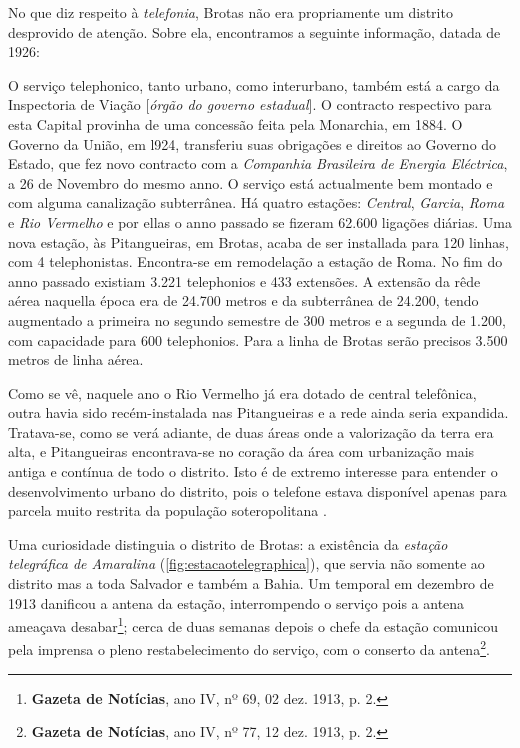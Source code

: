 No que diz respeito à \textit{telefonia}, Brotas não era propriamente um distrito desprovido de atenção. Sobre ela, encontramos a seguinte informação, datada de 1926:

\begin{citacao}
O serviço telephonico, tanto urbano, como interurbano, também está a cargo da Inspectoria de Viação [\textit{órgão do governo estadual}].
O contracto respectivo para esta Capital provinha de uma concessão feita pela Monarchia, em 1884.
O Governo da União, em l924, transferiu suas obrigações e direitos ao Governo do Estado, que fez novo contracto com a \textit{Companhia Brasileira de Energia Eléctrica}, a 26 de Novembro do mesmo anno.
O serviço está actualmente bem montado e com alguma canalização subterrânea.
Há quatro estações: \textit{Central}, \textit{Garcia}, \textit{Roma} e \textit{Rio Vermelho} e por ellas o anno passado se fizeram 62.600 ligações diárias.
Uma nova estação, às Pitangueiras, em Brotas, acaba de ser installada para 120 linhas, com 4 telephonistas.
Encontra-se em remodelação a estação de Roma.
No fim do anno passado existiam 3.221 telephonios e 433 extensões.
A extensão da rêde aérea naquella época era de 24.700 metros e da subterrânea de 24.200, tendo augmentado a primeira no segundo semestre de 300 metros e a segunda
de 1.200, com capacidade para 600 telephonios.
Para a linha de Brotas serão precisos 3.500 metros de linha aérea. \cite[pp.~266-267]{bahia_rpe_1926}
\end{citacao}

Como se vê, naquele ano o Rio Vermelho já era dotado de central telefônica, outra havia sido recém-instalada nas Pitangueiras e a rede ainda seria expandida. Tratava-se, como se verá adiante, de duas áreas onde a valorização da terra era alta, e Pitangueiras encontrava-se no coração da área com urbanização mais antiga e contínua de todo o distrito. Isto é de extremo interesse para entender o desenvolvimento urbano do distrito, pois o telefone estava disponível apenas para parcela muito restrita da população soteropolitana \cite[pp.~256-257]{SAMPAIO2005}.

Uma curiosidade distinguia o distrito de Brotas: a existência da \textit{estação telegráfica de Amaralina} (\autoref{fig:estacaotelegraphica}), que servia não somente ao distrito mas a toda Salvador e também a Bahia. Um temporal em dezembro de 1913 danificou a antena da estação, interrompendo o serviço pois a antena ameaçava desabar\footnote{\textbf{Gazeta de Notícias}, ano IV, nº 69, 02 dez. 1913, p. 2.}; cerca de duas semanas depois o chefe da estação comunicou pela imprensa o pleno restabelecimento do serviço, com o conserto da antena\footnote{\textbf{Gazeta de Notícias}, ano IV, nº 77, 12 dez. 1913, p. 2.}.

